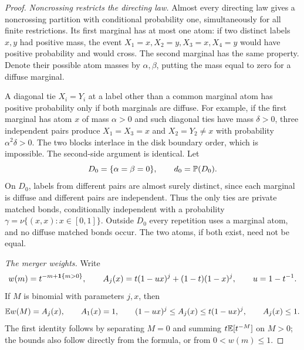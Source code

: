 \begin{proof}
\emph{Noncrossing restricts the directing law.}
Almost every directing law gives a noncrossing partition with
conditional probability one, simultaneously for all finite
restrictions.  Its first marginal has at most one atom: if two
distinct labels $x,y$ had positive mass, the event
$X_1=x,X_2=y,X_3=x,X_4=y$ would have positive probability and would
cross.  The second marginal has the same property.  Denote their
possible atom masses by $\alpha,\beta$, putting the mass equal to zero
for a diffuse marginal.

A diagonal tie $X_i=Y_i$ at a label other than a common marginal atom
has positive probability only if both marginals are diffuse.  For
example, if the first marginal has atom $x$ of mass $\alpha>0$ and
such diagonal ties have mass $\delta>0$, three independent pairs
produce $X_1=X_3=x$ and $X_2=Y_2\ne x$ with probability
$\alpha^2\delta>0$.  The two blocks interlace in the disk boundary
order, which is impossible.  The second-side argument is identical.
Let
\[
 D_0=\{\alpha=\beta=0\},\qquad d_0=\mathbb P(D_0).
\]
On $D_0$, labels from different pairs are almost surely distinct,
since each marginal is diffuse and different pairs are independent.
Thus the only ties are private matched bonds, conditionally
independent with a probability $\gamma=\nu\{(x,x):x\in[0,1]\}$.
Outside $D_0$ every repetition uses a marginal atom, and no diffuse
matched bonds occur.  The two atoms, if both exist, need not be equal.

\emph{The merger weights.}
Write
\begin{equation}\label{sector:A-definition}
 w(m)=t^{-m+\mathbf 1\{m>0\}},\qquad
 A_j(x)=t(1-ux)^j+(1-t)(1-x)^j,
 \qquad u=1-t^{-1}.
\end{equation}
If $M$ is binomial with parameters $j,x$, then
\begin{equation}\label{sector:A-bounds}
 \mathbb E w(M)=A_j(x),\qquad A_1(x)=1,\qquad
 (1-ux)^j\leq A_j(x)\leq t(1-ux)^j,\qquad A_j(x)\leq1.
\end{equation}
The first identity follows by separating $M=0$ and summing
$t\mathbb E[t^{-M}]$ on $M>0$; the bounds also follow directly from the
formula, or from $0<w(m)\leq1$.


\end{proof}
